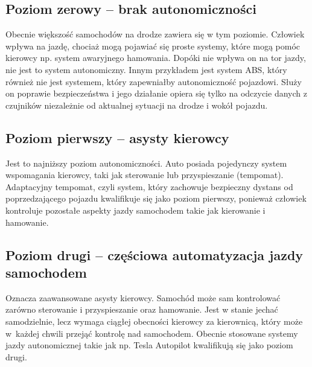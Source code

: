 \subsection{Poziom zerowy -- brak autonomiczności}

Obecnie większość samochodów na drodze zawiera się w tym poziomie. %
Człowiek wpływa na jazdę, chociaż mogą pojawiać się proste systemy, które mogą pomóc kierowcy np. system awaryjnego hamowania. 
Dopóki nie wpływa on na tor jazdy, nie jest to system autonomiczny. 
Innym przykładem jest system ABS, który również nie jest systemem, który zapewniałby autonomiczność pojazdowi. %
Służy on poprawie bezpieczeństwa i jego działanie opiera się tylko na odczycie danych z czujników niezależnie od aktualnej sytuacji na drodze i wokół pojazdu. %

\subsection{Poziom pierwszy -- asysty kierowcy}

Jest to najniższy poziom autonomiczności. 
Auto posiada pojedynczy system wspomagania kierowcy, taki jak sterowanie lub przyspieszanie (tempomat). 
Adaptacyjny tempomat, czyli system, który zachowuje bezpieczny dystans od poprzedzającego pojazdu kwalifikuje się jako poziom pierwszy, ponieważ człowiek kontroluje pozostałe aspekty jazdy samochodem takie jak kierowanie i hamowanie. %

\subsection{Poziom drugi -- częściowa automatyzacja jazdy samochodem}
Oznacza zaawansowane asysty kierowcy. %
Samochód może sam kontrolować zarówno sterowanie i przyspieszanie oraz hamowanie. %
Jest w stanie jechać samodzielnie, lecz wymaga ciągłej obecności kierowcy za kierownicą, który może w~każdej chwili przejąć kontrolę nad samochodem. 
Obecnie stosowane systemy jazdy autonomicznej takie jak np. Tesla Autopilot kwalifikują się jako poziom drugi.

